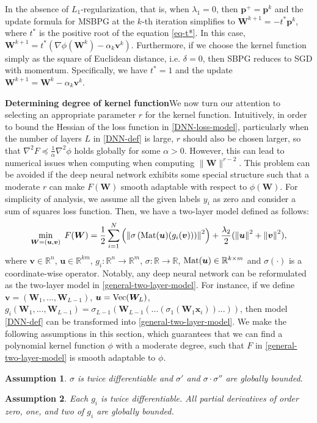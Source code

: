 \documentclass[twoside,11pt]{article}
\newcommand{\be}{\begin{equation}}
\newcommand{\ee}{\end{equation}}
\newcommand{\R}{\mathbb R}
\def\norm#1{\left\|#1\right\|}
\def\Mat{{\rm Mat}}
\newtheorem{assumption}{Assumption}%
\def\vp{{\bm{p}}}
\def\vu{{\bm{u}}}
\def\vv{{\bm{v}}}
\def\vx{{\bm{x}}}
\def\mW{{\bm{W}}}
\begin{document}
In the absence of $L_1$-regularization, that is, when $\lambda_1=0$, 
then $\bm{p}^+ = \bm{p}^k$ and 
the update formula for MSBPG  at the $k$-th iteration simplifies to ${\mW}^{k+1}=-t^* \vp^k$, where $t^*$ is the positive root of the equation \eqref{eq-t*}. In this case, $\mW^{k+1} = t^*(\nabla\phi(\mW^k)-\alpha_k\vv^k)$. Furthermore, if we choose the kernel function simply as the square of Euclidean distance, i.e. $\delta=0$, then SBPG  reduces to SGD with momentum. Specifically, we have $t^*=1$ and the update ${\mW}^{k+1}={\mW}^k-\alpha_k\vv^k$.

\vspace{1em}
\noindent\textbf{Determining degree of kernel function}\quad We now turn our attention to selecting an appropriate parameter $r$ for the kernel function. Intuitively, in order to bound the Hessian of the loss function in \eqref{DNN-loss-model}, particularly when the number of layers $L$ in \eqref{DNN-def} is large, $r$ should also be chosen larger, so that $\nabla^2F\preceq\frac{1}{\alpha}\nabla^2\phi$ holds globally for some $\alpha>0$. However, this can lead to numerical issues when computing when computing $\|{\mW}\|^{r-2}$. This problem can be avoided if the deep neural network exhibits some special structure such that a moderate $r$ can make $F(\mW)$ smooth adaptable with respect to $\phi(\mW)$. For simplicity of analysis, we assume all the given labels $y_i$ as zero and consider a sum of squares loss function. Then, we have a two-layer model defined as follows:
\be 
\min_{\mW=(\vu,\vv)}\;F(\mW)=\frac{1}{2}\sum_{i=1}^N\left(\left\|\sigma\left(\Mat(\vu)(g_i(\vv))\right)\right\|^2\right)+\frac{\lambda_2}{2}(\norm{\vu}^2+\norm{\vv}^2),
\label{general-two-layer-model}
\ee 
where $\vv\in\R^n$, $\vu\in\R^{km}$, $g_i:\R^n\rightarrow\R^m$, $\sigma:\R\rightarrow\R$, $\Mat(\vu)\in\R^{k\times m}$ and $\sigma(\cdot)$ is a coordinate-wise operator. Notably, any deep neural network can be reformulated as the two-layer model in \eqref{general-two-layer-model}. For instance, if we define $\vv=(\mW_1,...,\mW_{L-1})$, $\vu={\rm Vec}(\mW_L)$, $g_i(\mW_1,...,\mW_{L-1})=\sigma_{L-1}(\mW_{L-1}(...(\sigma_1( \mW_1\vx_i))...))$, then model \eqref{DNN-def} can be transformed into \eqref{general-two-layer-model}. We make the following assumptions in this section, which guarantees that we can find a polynomial kernel function $\phi$ with a moderate degree, such that $F$ in \eqref{general-two-layer-model} is smooth adaptable to $\phi$.
\begin{assumption}\label{act-func}
 $\sigma$ is twice differentiable and $\sigma'$ and $\sigma\cdot\sigma''$ are globally bounded.
\label{bound_assumption_activation}
\end{assumption}
\begin{assumption}
 Each $g_i$ is twice differentiable. All partial derivatives of order zero, one, and two of $g_i$ are globally bounded.
\label{bound_assumption_bn}
\end{assumption}
\end{document}
